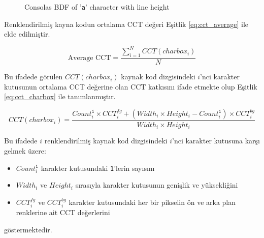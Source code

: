 \documentclass{article}
\begin{document}

\begin{figure}[htbp]
  \centering
  \caption{Consolas BDF of '\texttt{a}' character with line height}
  \label{fig:letter_a}

\end{figure}

Renklendirilmiş kayna kodun ortalama CCT değeri Eşitlik \ref{eq:cct_average} ile elde edilmiştir.

\begin{equation}
  \text{Average CCT} = \frac{\sum_{i=1}^{N} CCT(charbox_{i})}{N}
	\label{eq:cct_average}
\end{equation}

Bu ifadede görülen $CCT(charbox_{i})$ kaynak kod dizgisindeki $i$'nci karakter kutusunun ortalama CCT değerine olan CCT
katkısını ifade etmekte olup Eşitlik \ref{eq:cct_charbox} ile tanımlanmıştır.

\begin{equation}
	CCT(charbox_{i}) = \frac{
		Count_{i}^{\texttt{1}} \times CCT_{i}^{fg} +
		(Width_{i} \times Height_{i} - Count_{i}^{\texttt{1}}) \times CCT_{i}^{bg}
	}{
		Width_{i} \times Height_{i}
	}
	\label{eq:cct_charbox}
\end{equation}

Bu ifadede $i$ renklendirilmiş kaynak kod dizgisindeki $i$'nci karakter kutusuna karşı gelmek üzere:

\begin{itemize}
	\item $Count_{i}^{\texttt{1}}$ karakter kutusundaki \texttt{1}'lerin sayısını
	\item $Width_{i}$ ve $Height_{i}$ sırasıyla karakter kutusunun genişlik ve yüksekliğini
	\item $CCT_{i}^{fg}$ ve $CCT_{i}^{bg}$ karakter kutusundaki her bir pikselin ön ve arka plan renklerine ait CCT değerlerini
\end{itemize}

göstermektedir.
\end{document}
